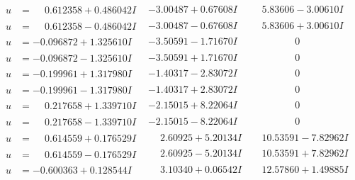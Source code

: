 \documentclass[1p]{elsarticle_modified}
\theoremstyle{definition}
\begin{document}
$$\begin{array}{c|c|c}
\begin{aligned}
u &= \phantom{-}0.612358 + 0.486042 I\end{aligned}
 & -3.00487 + 0.67608 I & \phantom{-}5.83606 - 3.00610 I \\ \hline\begin{aligned}
u &= \phantom{-}0.612358 - 0.486042 I\end{aligned}
 & -3.00487 - 0.67608 I & \phantom{-}5.83606 + 3.00610 I \\ \hline\begin{aligned}
u &= -0.096872 + 1.325610 I\end{aligned}
 & -3.50591 - 1.71670 I & \phantom{-0.000000 } 0 \\ \hline\begin{aligned}
u &= -0.096872 - 1.325610 I\end{aligned}
 & -3.50591 + 1.71670 I & \phantom{-0.000000 } 0 \\ \hline\begin{aligned}
u &= -0.199961 + 1.317980 I\end{aligned}
 & -1.40317 - 2.83072 I & \phantom{-0.000000 } 0 \\ \hline\begin{aligned}
u &= -0.199961 - 1.317980 I\end{aligned}
 & -1.40317 + 2.83072 I & \phantom{-0.000000 } 0 \\ \hline\begin{aligned}
u &= \phantom{-}0.217658 + 1.339710 I\end{aligned}
 & -2.15015 + 8.22064 I & \phantom{-0.000000 } 0 \\ \hline\begin{aligned}
u &= \phantom{-}0.217658 - 1.339710 I\end{aligned}
 & -2.15015 - 8.22064 I & \phantom{-0.000000 } 0 \\ \hline\begin{aligned}
u &= \phantom{-}0.614559 + 0.176529 I\end{aligned}
 & \phantom{-}2.60925 + 5.20134 I & \phantom{-}10.53591 - 7.82962 I \\ \hline\begin{aligned}
u &= \phantom{-}0.614559 - 0.176529 I\end{aligned}
 & \phantom{-}2.60925 - 5.20134 I & \phantom{-}10.53591 + 7.82962 I \\ \hline\begin{aligned}
u &= -0.600363 + 0.128544 I\end{aligned}
 & \phantom{-}3.10340 + 0.06542 I & \phantom{-}12.57860 + 1.49885 I \\ \hline\begin{aligned}

\end{aligned}
\end{array}$$
\end{document}
